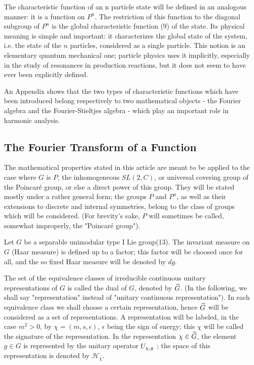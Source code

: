 \documentclass[a4paper,11pt]{article}
\begin{document}
The characteristic function of an n particle state will be defined in an analogous manner: it 
is a function on $P^n$. The restriction of this function to the diagonal subgroup of $P^n$ is 
the global characteristic function (9) of the state. Its physical meaning is simple and 
important: it characterizes the global state of the system, i.e. the state of the $n$ 
particles, considered as a single particle. This notion is an elementary quantum mechanical 
one; particle physics uses it implicitly, especially in the study of resonances in production 
reactions, but it does not seem to have ever been explicitly defined. 

An Appendix shows that the two types of characteristic functions which have been introduced 
belong respectively to two mathematical objects - the Fourier algebra and the Fourier-Stieltjes 
algebra - which play an important role in harmonic analysis.

\subsection{The Fourier Transform of a Function}

The mathematical properties stated in this article are meant to be applied to the case where 
$G$ is $P$, the inhomogeneous $SL(2,C)$, or universal covering group of the Poincar\'e  group, or 
else a direct power of this group.  They will be stated mostly under a rather general form; the 
groups $P$ and $P^n$, as well as their extensions to discrete and internal symmetries, belong 
to the class of groups which will be considered. (For brevity's sake, $P$ will sometimes be 
called, somewhat improperly, the "Poincar\'e  group"). 

Let $G$ be a separable unimodular type I Lie group(13). The invariant measure on $G$ (Haar 
measure) is defined up to a factor; this factor will be choosed once for all, and the so fixed 
Haar measure will be denoted by $dg$. 

The set of the equivalence classes of irreducible continuous unitary representations of $G$ is 
called the dual of $G$, denoted by $\widehat{G}$. (In the following, we shall say "representation" 
instead of "unitary continuous representation"). In each equivalence class we shall choose a 
certain representation, hence $\widehat{G}$ will be considered as a set of representations. A 
representation will be labeled, in the case $m^2>0$, by $\chi = (m, s, \epsilon)$, $\epsilon$ 
being the sign of energy; this $\chi$ will be called the signature of the representation. In 
the representation $\chi \in  \widehat{G}$, the element $g \in  G$ is represented by the unitary 
operator $U_{\chi,g}$ ; the space of this representation is denoted by $\mathcal{H}_{\chi}$. 
\end{document}
